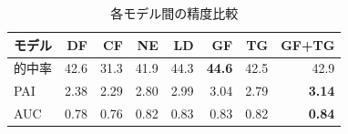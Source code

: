 \begin{table}[htbp]
  \centering
  \caption{各モデル間の精度比較}
  \begin{tabular}{l|r||r|r|r|r|r|r}
  \hline

  モデル & DF & CF & NE & LD & GF & TG & GF+TG \\  \hline\hline
  的中率 & 42.6 & 31.3 & 41.9 & 44.3 & \bf{44.6} & 42.5 & 42.9 \\ 
  PAI & 2.38 & 2.29 & 2.80 & 2.99 & 3.04 & 2.79 & \bf{3.14} \\ 
  AUC & 0.78 & 0.76 & 0.82 & 0.83 & 0.83 & 0.82 & \bf{0.84} \\ \hline
  


  \end{tabular}
  \label{tb:fig:add-crime-timeseries-index}
\end{table}

\FloatBarrier